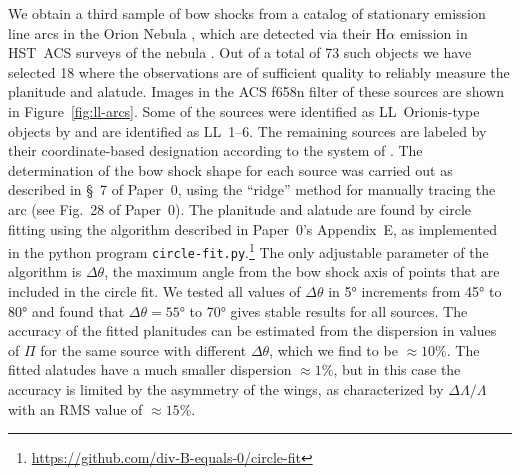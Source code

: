 We obtain a third sample of bow shocks from a catalog of stationary
emission line arcs in the Orion Nebula \citep{Bally:2000a}, which are
detected via their H\(\alpha\) emission in HST~ACS surveys of the nebula
\citep{Bally:2006a, Robberto:2013a}.  Out of a total of 73 such
objects \citep{Gutierrez-Soto:2015a} we have selected 18 where the
observations are of sufficient quality to reliably measure the
planitude and alatude.  Images in the ACS f658n filter of these
sources are shown in Figure~\ref{fig:ll-arcs}.  Some of the sources
were identified as LL~Orionis-type objects by \citet{Bally:2001a} and
are identified as LL~1--6. The remaining sources are labeled by their
coordinate-based designation according to the system of
\citet{ODell:1994a}.  The determination of the bow shock shape for
each source was carried out as described in \S~7 of Paper~0, using the
``ridge'' method for manually tracing the arc (see Fig.~28 of
Paper~0).  The planitude and alatude are found by circle fitting using
the algorithm described in Paper~0's Appendix~E, as implemented in the
python program
\texttt{circle-fit.py}.\footnote{\url{https://github.com/div-B-equals-0/circle-fit}}
The only adjustable parameter of the algorithm is \(\Delta\theta\), the maximum
angle from the bow shock axis of points that are included in the
circle fit.  We tested all values of \(\Delta\theta\) in \ang{5} increments from
\ang{45} to \ang{80} and found that \(\Delta\theta = \ang{55}\) to \ang{70}
gives stable results for all sources.  The accuracy of the fitted
planitudes can be estimated from the dispersion in values of \(\Pi\) for
the same source with different \(\Delta\theta\), which we find to be
\(\approx 10\%\).  The fitted alatudes have a much smaller dispersion
\(\approx 1 \%\), but in this case the accuracy is limited by the asymmetry
of the wings, as characterized by \(\Delta\Lambda/\Lambda\) with an RMS value of
\(\approx 15\%\).

